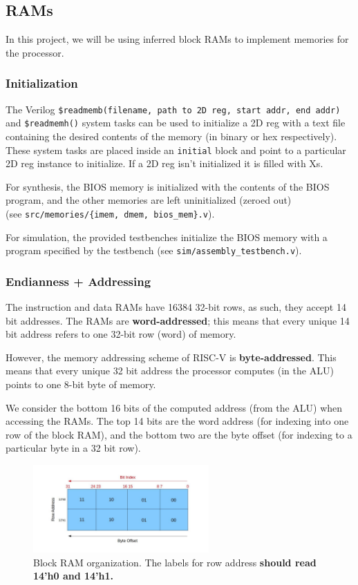 \documentclass[11pt]{article}
\begin{document}
\subsection{RAMs}
\label{ram_info}
In this project, we will be using inferred block RAMs to implement memories for the processor.

\subsubsection{Initialization}
The Verilog \verb|$readmemb(filename, path to 2D reg, start addr, end addr)| and \verb|$readmemh()| system tasks can be used to initialize a 2D reg with a text file containing the desired contents of the memory (in binary or hex respectively).
These system tasks are placed inside an \verb|initial| block and point to a particular 2D reg instance to initialize.
If a 2D reg isn't initialized it is filled with Xs.

For synthesis, the BIOS memory is initialized with the contents of the BIOS program, and the other memories are left uninitialized (zeroed out)\\
(see \verb|src/memories/{imem, dmem, bios_mem}.v|).

For simulation, the provided testbenches initialize the BIOS memory with a program specified by the testbench (see \verb|sim/assembly_testbench.v|).

\subsubsection{Endianness + Addressing}
The instruction and data RAMs have 16384 32-bit rows, as such, they accept 14 bit addresses.
The RAMs are \textbf{word-addressed}; this means that every unique 14 bit address refers to one 32-bit row (word) of memory.

However, the memory addressing scheme of RISC-V is \textbf{byte-addressed}.
This means that every unique 32 bit address the processor computes (in the ALU) points to one 8-bit byte of memory.

We consider the bottom 16 bits of the computed address (from the ALU) when accessing the RAMs.
The top 14 bits are the word address (for indexing into one row of the block RAM), and the bottom two are the byte offset (for indexing to a particular byte in a 32 bit row).

\label{endianness}
\begin{figure}[H]
  \begin{center}
    \includegraphics[width=0.6\textwidth]{endianness_img}
    \caption{Block RAM organization. The labels for row address \textbf{should read 14'h0 and 14'h1.}}
    \label{fig:endianness_img}
  \end{center}
\end{figure}
\end{document}
